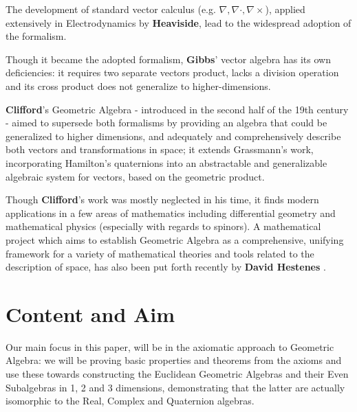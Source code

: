 The development of standard vector calculus (e.g. $\nabla, \nabla \cdot, \nabla \times$), applied extensively in Electrodynamics by \textbf{Heaviside}, lead to the widespread adoption of the formalism.

Though it became the adopted formalism, \textbf{Gibbs}' vector algebra has its own deficiencies: it requires two separate vectors product, lacks a division operation and its cross product does not generalize to higher-dimensions.

\textbf{Clifford}'s  Geometric Algebra - introduced in the second half of the 19th century - aimed to supersede both formalisms by providing an algebra that could be generalized to higher dimensions, and adequately and comprehensively describe both vectors and transformations in space; it extends Grassmann's work, incorporating Hamilton's quaternions into an abstractable and generalizable algebraic system for vectors, based on the geometric product.

Though \textbf{Clifford}'s work was mostly neglected in his time, it finds modern applications in a few areas of mathematics including differential geometry and mathematical physics (especially with regards to spinors). A mathematical project which aims to establish Geometric Algebra as a comprehensive, unifying framework for a variety of mathematical theories and tools related to the description of space, has also been put forth recently by \textbf{David Hestenes} \cite{ga-origin}.%

\newpage

\section{Content and Aim}

Our main focus in this paper, will be in the axiomatic approach to Geometric Algebra: we will be proving basic properties and theorems from the axioms and use these towards constructing the Euclidean Geometric Algebras and their Even Subalgebras in 1, 2 and 3 dimensions, demonstrating that the latter are actually isomorphic to the Real, Complex and Quaternion algebras.

